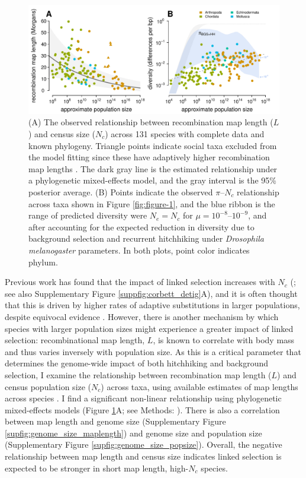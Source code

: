 \documentclass[11pt]{article}
\newcommand{\Newnameref}[1]{\textit{\nameref{#1}}}
\begin{document}
\begin{figure}[t!]
  \centering
  \includegraphics[width=\textwidth]{figures/figure_3.pdf}

  \caption{(A) The observed relationship between recombination map length ($L$)
    and census size ($N_c$) across 131 species with complete data and known
    phylogeny. Triangle points indicate social taxa excluded from the model
    fitting since these have adaptively higher recombination map lengths
    \parencite{Wilfert2007-dx}. The dark gray line is the estimated
    relationship under a phylogenetic mixed-effects model, and the gray
    interval is the 95\% posterior average.  (B) Points indicate the observed
    $\pi$--$N_c$ relationship across taxa shown in Figure \ref{fig:figure-1},
    and the blue ribbon is the range of predicted diversity were $N_e = N_c$
    for $\mu = 10^{-8}$--$10^{-9}$,  and after accounting for the expected
  reduction in diversity due to background selection and recurrent hitchhiking
under \emph{Drosophila melanogaster} parameters. In both plots, point color
indicates phylum.}

  \label{fig:figure-3}
\end{figure}

Previous work has found that the impact of linked selection increases with
$N_c$ (\cite{Corbett-Detig2015-gt}; see also Supplementary Figure
\ref{suppfig:corbett_detig}A), and it is often thought that this is driven by
higher rates of adaptive substitutions in larger populations, despite equivocal
evidence \parencite{Galtier2016-dq}. However, there is another mechanism by
which species with larger population sizes might experience a greater impact of
linked selection: recombinational map length, $L$, is known to correlate with
body mass \parencite{Burt1987-tq} and thus varies inversely with population
size. As this is a critical parameter that determines the genome-wide impact of
both hitchhiking and background selection, I examine the relationship between
recombination map length ($L$) and census population size ($N_c$) across taxa,
using available estimates of map lengths across species
\parencite{Stapley2017-fs,Corbett-Detig2015-gt}. I find a significant
non-linear relationship using phylogenetic mixed-effects models (Figure
\ref{fig:figure-3}A; see Methods: \Newnameref{sec:methods-pcm}). There is also
a correlation between map length and genome size (Supplementary Figure
\ref{supfig:genome_size_maplength}) and genome size and population size
(Supplementary Figure \ref{supfig:genome_size_popsize}). Overall, the negative
relationship between map length and census size indicates linked selection is
expected to be stronger in short map length, high-$N_c$ species.
\end{document}

